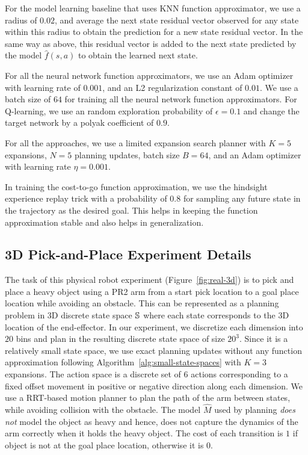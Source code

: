 For the model learning baseline that uses KNN function approximator,
we use a radius of $0.02$, and average the next state residual vector observed
for any state within this radius to obtain the prediction for a new
state residual vector. In the same way as above, this residual vector
is added to the next state predicted by the model $\hat{f}(s, a)$ to
obtain the learned next state.

For all the neural network function approximators, we use an Adam
optimizer with learning rate of $0.001$, and an L2 regularization
constant of $0.01$. We use a batch size of $64$ for training all the
neural network function approximators. For Q-learning, we use an
random exploration probability of $\epsilon = 0.1$ and change the
target network by a polyak coefficient of $0.9$.

For all the approaches, we use a
limited expansion search planner with $K = 5$ expansions, $N = 5$
planning updates, batch size $B = 64$, and an Adam optimizer \cite{DBLP:journals/corr/KingmaB14} with
learning rate $\eta = 0.001$.

In training the cost-to-go function approximation, we use the
hindsight experience replay trick with a probability of $0.8$ for
sampling any future state in the trajectory as the desired goal. This
helps in keeping the function approximation stable and also helps in
generalization.

\subsection{3D Pick-and-Place Experiment Details}
\label{sec:3d-pick-place}

The task of this physical robot experiment (Figure~\ref{fig:real-3d})
is to pick and place a heavy object using a PR2 arm from a start pick
location to a goal place
location while avoiding an obstacle. This can be represented as a
planning problem in 3D discrete state space $\mathbb{S}$ where
each state corresponds to the 3D location of the end-effector. In our
experiment, we discretize each dimension into $20$ bins and plan in
the resulting discrete state space of size $20^3$. Since it is a
relatively small state space, we use exact planning updates without
any function approximation following
Algorithm~\ref{alg:small-state-spaces} with $K=3$ expansions. The action space is a
discrete set of $6$ actions corresponding to a fixed offset movement
in positive or negative direction along each dimension. We use a
RRT-based motion planner \cite{DBLP:journals/ijrr/LaValleK01} to plan the path of the
arm between states, while avoiding collision with the obstacle. The
model $\hat{M}$ used by planning \textit{does not} model the object as
heavy and hence, does not capture the dynamics of the arm correctly when it
holds the heavy object. The cost of each transition is $1$ if
object is not at the goal place location, otherwise it is $0$.

